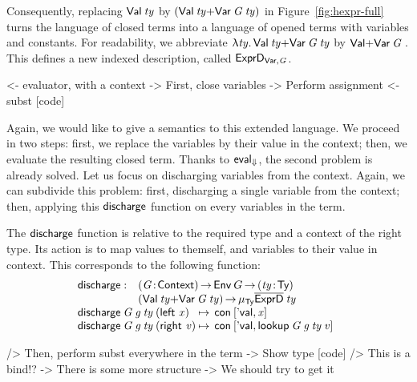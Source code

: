 Consequently, replacing $\Val{\V{ty}}$ by
$(\SUM{\Val{\V{ty}}}{\Var{\V{G}}{\V{ty}}})$ in
Figure~\ref{fig:hexpr-full} turns the language of closed terms into a
language of opened terms with variables and constants. For
readability, we abbreviate $\LAM{\V{ty}}
\SUM{\Val{\V{ty}}}{\Var{\V{G}}{\V{ty}}}$ by
$\SUM{\SYMBVal}{\Var{\V{G}}{}}$.  This defines a new indexed description,
called $\HExprVarD{\V{G}}$.

\begin{wstructure}
        <- evaluator, with a context
            -> First, close variables
                -> Perform assignment
                <- subst [code]
\end{wstructure}

\newcommand{\discharge}{\F{discharge}}

Again, we would like to give a semantics to this extended language. We
proceed in two steps: first, we replace the variables by their value
in the context; then, we evaluate the resulting closed term. Thanks to
$\evalH$, the second problem is already solved. Let us focus on
discharging variables from the context. Again, we can subdivide this
problem: first, discharging a single variable from the context; then,
applying this $\discharge$ function on every variables in the term.

The $\discharge$ function is relative to the required type and a
context of the right type. Its action is to map values to themself,
and variables to their value in context. This corresponds to the
following function:
%
\[\stk{
\begin{array}{@{}ll}
\discharge : & \PI{\V{G}}{\Ctxt}
               \Env{G} \To
               \PITEL{\V{ty}}{\Ty} \\
             & (\SUM{\Val{\V{ty}}}{\Var{\V{G}}{\V{ty}}}) \To
               \IMu{\Ty}{\toIDesc{\HExprD}}{\V{ty}} 
\end{array} \\
\begin{array}{@{}l@{\:\mapsto\:\:}l}
\discharge\: \V{G}\: \V{g}\: \V{ty}\: (\SumLeft \V{x})  & 
    \Con{\pair{\SYMBEval}{\V{x}}{}} \\
\discharge\: \V{G}\: \V{g}\: \V{ty}\: (\SumRight \V{v}) &
    \Con{\pair{\SYMBEval}{\lookup{\V{G}}{\V{g}}{\V{ty}}{\V{v}}}{}}
\end{array}
}\]

\begin{wstructure}
            /> Then, perform subst everywhere in the term
                -> Show type [code]
                /> This is a bind!?
                -> There is some more structure 
                    -> We should try to get it
\end{wstructure}

